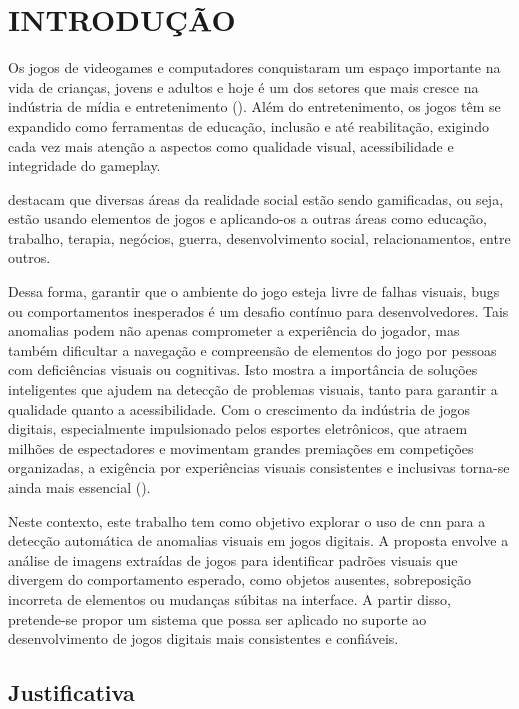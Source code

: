 \chapter{INTRODUÇÃO}

Os  jogos  de videogames e computadores  conquistaram  um espaço  importante  na  vida de  crianças,  jovens  e  adultos  e  hoje  é  um  dos  setores  que  mais  cresce  na  indústria  de mídia   e   entretenimento (). Além do entretenimento, os jogos têm se expandido como ferramentas de educação, inclusão e até reabilitação, exigindo cada vez mais atenção a aspectos como qualidade visual, acessibilidade e integridade do gameplay. 

 destacam que diversas áreas da realidade social estão sendo gamificadas, ou seja, estão usando elementos de jogos e aplicando-os a outras áreas como educação, trabalho, terapia, negócios, guerra, desenvolvimento social, relacionamentos, entre outros.

Dessa forma, garantir que o ambiente do jogo esteja livre de falhas visuais, bugs ou comportamentos inesperados é um desafio contínuo para desenvolvedores. Tais anomalias podem não apenas comprometer a experiência do jogador, mas também dificultar a navegação e compreensão de elementos do jogo por pessoas com deficiências visuais ou cognitivas. Isto mostra a importância de soluções inteligentes que ajudem na detecção de problemas visuais, tanto para garantir a qualidade quanto a acessibilidade. Com o crescimento da indústria de jogos digitais, especialmente impulsionado pelos esportes eletrônicos, que atraem milhões de espectadores e movimentam grandes premiações em competições organizadas, a exigência por experiências visuais consistentes e inclusivas torna-se ainda mais essencial ().

Neste contexto, este trabalho tem como objetivo explorar o uso de \gls{cnn} para a detecção automática de anomalias visuais em jogos digitais. A proposta envolve a análise de imagens extraídas de jogos para identificar padrões visuais que divergem do comportamento esperado, como objetos ausentes, sobreposição incorreta de elementos ou mudanças súbitas na interface. A partir disso, pretende-se propor um sistema que possa ser aplicado no suporte ao desenvolvimento de jogos digitais mais consistentes e confiáveis.

\section{Justificativa}

